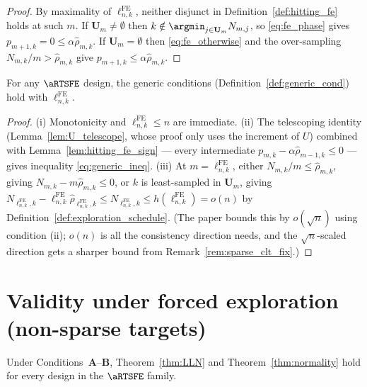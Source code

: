 \begin{proof}
By maximality of $\ell_{n,k}^{\mathrm{FE}}$, neither disjunct in
Definition~\ref{def:hitting_fe} holds at such $m$. If $\mathbf{U}_m\ne\emptyset$
then $k\notin\argmin_{j\in\mathbf{U}_m}N_{m,j}$, so \eqref{eq:fe_phase} gives
$p_{m+1,k}=0\le\alpha\hat{\rho}_{m,k}$. If $\mathbf{U}_m=\emptyset$ then
\eqref{eq:fe_otherwise} and the over-sampling $N_{m,k}/m>\hat{\rho}_{m,k}$ give
$p_{m+1,k}\le\alpha\hat{\rho}_{m,k}$.
\end{proof}

\begin{lemma}\label{lem:preliminary_fe}
\leanok
{}
For any $\aRTSFE$ design, the generic conditions
(Definition~\ref{def:generic_cond}) hold with $\ell_{n,k}^{\mathrm{FE}}$.
\end{lemma}

\begin{proof}
(i) Monotonicity and $\ell_{n,k}^{\mathrm{FE}}\le n$ are immediate. (ii) The
telescoping identity (Lemma~\ref{lem:U_telescope}, whose proof only uses the
increment of $U$) combined with Lemma~\ref{lem:hitting_fe_sign} — every
intermediate $p_{m,k}-\alpha\hat{\rho}_{m-1,k}\le0$ — gives inequality
\eqref{eq:generic_ineq}. (iii) At $m=\ell_{n,k}^{\mathrm{FE}}$, either
$N_{m,k}/m\le\hat{\rho}_{m,k}$, giving $N_{m,k}-m\hat{\rho}_{m,k}\le0$, or $k$ is
least-sampled in $\mathbf{U}_m$, giving
$N_{\ell_{n,k}^{\mathrm{FE}},k}-\ell_{n,k}^{\mathrm{FE}}\hat{\rho}_{\ell_{n,k}^{\mathrm{FE}},k}
 \le N_{\ell_{n,k}^{\mathrm{FE}},k}\le h(\ell_{n,k}^{\mathrm{FE}})=o(n)$
by Definition~\ref{def:exploration_schedule}. (The paper bounds this by $o(\sqrt n)$ using
condition (ii); $o(n)$ is all the consistency direction needs, and the $\sqrt n$-scaled direction
gets a sharper bound from Remark~\ref{rem:sparse_clt_fix}.)
\end{proof}

\section{Validity under forced exploration (non-sparse targets)}
\label{sec:forced_nonsparse}

\begin{theorem}\label{thm:forced_valid}
\leanok
{}
Under Conditions~\textbf{A}--\textbf{B}, Theorem~\ref{thm:LLN} and
Theorem~\ref{thm:normality} hold for every design in the $\aRTSFE$ family.
\end{theorem}

